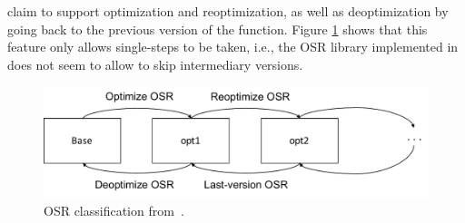  claim to support optimization and reoptimization, as well as deoptimization by going back to the previous version of the function.
Figure \ref{OSR classification} shows that this feature only allows single-steps to be taken, i.e., the OSR library implemented in~\cite{lameed2013modular} does not seem to allow to skip intermediary versions.\\

\begin{figure}[h]
\centering
\includegraphics[scale=0.5]{Figures/OSRClassification}
\decoRule
\caption[OSR classification]{OSR classification from~\cite{lameed2013modular}.}
\label{OSR classification}
\end{figure}

